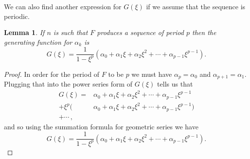 \documentclass[12pt]{article}
\newtheorem{lemma}{Lemma}
\begin{document}
We can also find another expression for $G(\xi)$ if we assume that the sequence is periodic. 
\begin{lemma} If $n$ is such that $F$ produces a sequence of period $p$ then the generating function for $\alpha_k$ is 
\begin{equation*}
G(\xi) = \frac{1}{1- \xi^p} (\alpha_0 + \alpha_1 \xi + \alpha_2 \xi^2 + \cdots + \alpha_{p-1} \xi^{p-1}).
\end{equation*}
\end{lemma}
\begin{proof}
In order for the period of $F$ to be $p$ we must have $\alpha_p= \alpha_0$ and $\alpha_{p+1} = \alpha_1$. Plugging that into the power series form of $G(\xi)$ tells us that
\begin{align*}
G(\xi) = &\alpha_0 + \alpha_1 \xi + \alpha_2 \xi^2 + \cdots + \alpha_{p-1} \xi^{p-1} \\
+ \xi^p(&\alpha_0 + \alpha_1 \xi + \alpha_2 \xi^2 + \cdots + \alpha_{p-1} \xi^{p-1}) \\ 
+ \cdots \, ,
\end{align*}
and so using the summation formula for geometric series we have
\begin{equation*}
G(\xi) = \frac{1}{1- \xi^p} (\alpha_0 + \alpha_1 \xi + \alpha_2 \xi^2 + \cdots + \alpha_{p-1} \xi^{p-1}).
\end{equation*}
\end{proof}
\end{document}
